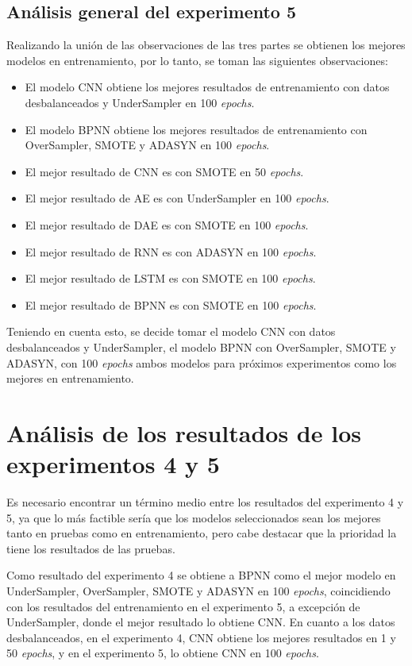   \subsection{An\'{a}lisis general del experimento 5}
    Realizando la uni\'{o}n de las observaciones de las tres partes se obtienen los mejores modelos en entrenamiento, por lo tanto, se toman las siguientes observaciones:
    \begin{itemize}
    	\item El modelo CNN obtiene los mejores resultados de entrenamiento con datos desbalanceados y UnderSampler en 100 \textit{epochs}.
    	\item El modelo BPNN obtiene los mejores resultados de entrenamiento con OverSampler, SMOTE y ADASYN en 100 \textit{epochs}.
    	\item El mejor resultado de CNN es con SMOTE en 50 \textit{epochs}.
    	\item El mejor resultado de AE es con 	UnderSampler en 100 \textit{epochs}.
    	\item El mejor resultado de DAE es con SMOTE en 100 \textit{epochs}.
    	\item El mejor resultado de RNN es con ADASYN en 100 \textit{epochs}.
    	\item El mejor resultado de LSTM es con SMOTE en 100 \textit{epochs}.
    	\item El mejor resultado de BPNN es con SMOTE en 100 \textit{epochs}.
    \end{itemize}
  
  Teniendo en cuenta esto, se decide tomar el modelo CNN con datos desbalanceados y UnderSampler, el modelo BPNN con OverSampler, SMOTE y ADASYN, con 100 \textit{epochs} ambos modelos para pr\'{o}ximos experimentos como los mejores en entrenamiento.
  
  \section{An\'{a}lisis de los resultados de los experimentos 4 y 5}
    Es necesario encontrar un t\'{e}rmino medio entre los resultados del experimento 4 y 5, ya que lo m\'{a}s factible ser\'{i}a que los modelos seleccionados sean los mejores tanto en pruebas como en entrenamiento, pero cabe destacar que la prioridad la tiene los resultados de las pruebas.
    
    Como resultado del experimento 4 se obtiene a BPNN como el mejor modelo en UnderSampler, OverSampler, SMOTE y ADASYN en 100 \textit{epochs}, coincidiendo con los resultados del entrenamiento en el experimento 5, a excepci\'{o}n de UnderSampler, donde el mejor resultado lo obtiene CNN. En cuanto a los datos desbalanceados, en el experimento 4, CNN obtiene los mejores resultados en 1 y 50 \textit{epochs}, y en el experimento 5, lo obtiene CNN en 100 \textit{epochs}.
    
